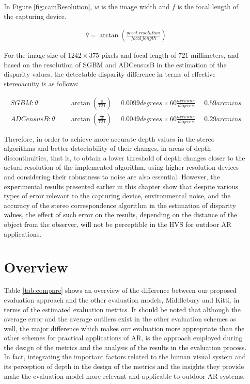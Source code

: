 \noindent
In Figure \ref{fig:camResolution}, $w$ is the image width and $f$ is the focal length of the capturing device.

\begin{align}
\label{eq:algResolution}
\theta = \arctan(\frac{pixel\_resolution}{focal\_length})
\end{align}

For the image size of $1242\times375$ pixels and focal length of $721$ millimeters, and based on the resolution of SGBM and ADCensusB in the estimation of the disparity values, 
the detectable disparity difference in terms of effective stereoacuity is as follows:

\begin{align}
\label{eq:alg:sgbmresolv} 
SGBM: \theta &= \arctan (\frac{\frac{1}{8}}{721}) = 0.0099 degrees \times 60 \frac{arcmins}{degrees} = 0.59 arcmins \\[2ex]
ADCensusB: \theta &= \arctan (\frac{\frac{1}{16}}{721}) = 0.0049 degrees \times 60 \frac{arcmins}{degrees}= 0.29 arcmins \label{eq:adcenresolv}
\end{align}
\noindent

Therefore, in order to achieve more accurate depth values in the stereo algorithms and better detectability of their changes, 
in areas of depth discontinuities, that is, to obtain a lower 
threshold of depth changes
closer to the actual resolution of the implemented algorithm, using higher resolution devices and considering their robustness to noise are also essential.
However, the experimental results presented earlier in this chapter
show that despite various types of error relevant to the capturing device, environmental noise, and the accuracy of the stereo correspondence algorithm
in the estimation of disparity values, the effect of such error on the results, depending on the distance of the object from the observer, 
will not be perceptible in the HVS for outdoor AR applications.

\section{Overview}
Table \ref{tab:compare} shows an overview of the difference between our proposed evaluation approach and the other evaluation models, Middlebury
and Kitti, in terms of the estimated evaluation metrics. \newline
It should be noted that although the average error and the average outliers exist in the other evaluation schemes as well, the major
difference which makes our evaluation more appropriate than the other schemes for practical applications of AR,
is the approach employed during the design of the metrics and the analysis of the results in the evaluation process. In fact, integrating the 
important factors related to the human visual system and its
perception of depth in the design of the metrics and the insights they provide make the evaluation model more relevant and applicable to outdoor AR systems. \newline

